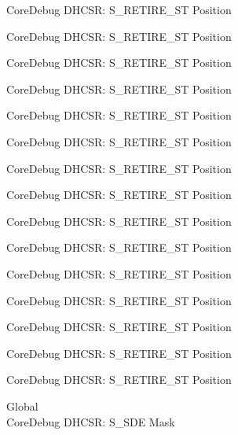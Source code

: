 \begin{DoxyRefList}
\label{deprecated__deprecated000111}%
%
Core\+Debug DHCSR\+: S\+\_\+\+RETIRE\+\_\+\+ST Position 

\label{deprecated__deprecated000165}%
%
Core\+Debug DHCSR\+: S\+\_\+\+RETIRE\+\_\+\+ST Position 

\label{deprecated__deprecated000250}%
%
Core\+Debug DHCSR\+: S\+\_\+\+RETIRE\+\_\+\+ST Position 

\label{deprecated__deprecated000307}%
%
Core\+Debug DHCSR\+: S\+\_\+\+RETIRE\+\_\+\+ST Position 

\label{deprecated__deprecated000383}%
%
Core\+Debug DHCSR\+: S\+\_\+\+RETIRE\+\_\+\+ST Position 

\label{deprecated__deprecated000462}%
%
Core\+Debug DHCSR\+: S\+\_\+\+RETIRE\+\_\+\+ST Position 

\label{deprecated__deprecated000564}%
%
Core\+Debug DHCSR\+: S\+\_\+\+RETIRE\+\_\+\+ST Position 

\label{deprecated__deprecated000689}%
%
Core\+Debug DHCSR\+: S\+\_\+\+RETIRE\+\_\+\+ST Position 

\label{deprecated__deprecated000789}%
%
Core\+Debug DHCSR\+: S\+\_\+\+RETIRE\+\_\+\+ST Position 

\label{deprecated__deprecated000843}%
%
Core\+Debug DHCSR\+: S\+\_\+\+RETIRE\+\_\+\+ST Position 

\label{deprecated__deprecated000928}%
%
Core\+Debug DHCSR\+: S\+\_\+\+RETIRE\+\_\+\+ST Position 

\label{deprecated__deprecated000985}%
%
Core\+Debug DHCSR\+: S\+\_\+\+RETIRE\+\_\+\+ST Position 

\label{deprecated__deprecated001061}%
%
Core\+Debug DHCSR\+: S\+\_\+\+RETIRE\+\_\+\+ST Position 

\label{deprecated__deprecated001140}%
%
Core\+Debug DHCSR\+: S\+\_\+\+RETIRE\+\_\+\+ST Position 

\label{deprecated__deprecated001242}%
%
Core\+Debug DHCSR\+: S\+\_\+\+RETIRE\+\_\+\+ST Position  
\item[Global \doxylink{group___c_m_s_i_s___s_c_b_ga67f2b2b6729ab2db89f97bbe75224e9d}{Core\+Debug\+\_\+\+DHCSR\+\_\+\+S\+\_\+\+SDE\+\_\+\+Msk} ]\hfill \\
\label{deprecated__deprecated000020}%
%
Core\+Debug DHCSR\+: S\+\_\+\+SDE Mask 


\end{DoxyRefList}
